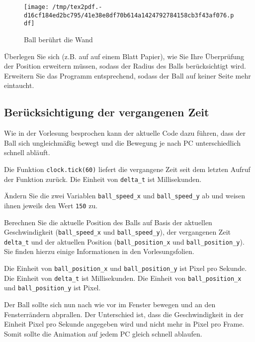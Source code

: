 \documentclass[
]{scrartcl}
\begin{document}
\begin{figure}
\centering
\texttt{[image: /tmp/tex2pdf.-d16cf184ed2bc795/41e38e8df70b614a1424792784158cb3f43af076.pdf]}
\caption{\label{fig:collision}Ball berührt die Wand}
\end{figure}

 Überlegen Sie sich (z.B. auf auf einem Blatt Papier), wie
Sie Ihre Überprüfung der Position erweitern müssen, sodass der Radius
des Balls berücksichtigt wird. Erweitern Sie das Programm entsprechend,
sodass der Ball auf keiner Seite mehr eintaucht.

\hypertarget{beruxfccksichtigung-der-vergangenen-zeit}{%
\subsection{Berücksichtigung der vergangenen
Zeit}\label{beruxfccksichtigung-der-vergangenen-zeit}}

Wie in der Vorlesung besprochen kann der aktuelle Code dazu führen, dass
der Ball sich ungleichmäßig bewegt und die Bewegung je nach PC
unterschiedlich schnell abläuft.

Die Funktion \texttt{clock.tick(60)} liefert die vergangene Zeit seit
dem letzten Aufruf der Funktion zurück. Die Einheit von
\texttt{delta\_t} ist Millisekunden.

 Ändern Sie die zwei Variablen \texttt{ball\_speed\_x} und
\texttt{ball\_speed\_y} ab und weisen ihnen jeweils den Wert
\texttt{150} zu.

 Berechnen Sie die aktuelle Position des Balls auf Basis
der aktuellen Geschwindigkeit (\texttt{ball\_speed\_x} und
\texttt{ball\_speed\_y}), der vergangenen Zeit \texttt{delta\_t} und der
aktuellen Position (\texttt{ball\_position\_x} und
\texttt{ball\_position\_y}). Sie finden hierzu einige Informationen in
den Vorlesungsfolien.

 Die Einheit von \texttt{ball\_position\_x}
und \texttt{ball\_position\_y} ist Pixel pro Sekunde. Die Einheit von
\texttt{delta\_t} ist Millisekunden. Die Einheit von
\texttt{ball\_position\_x} und \texttt{ball\_position\_y} ist Pixel.

Der Ball sollte sich nun nach wie vor im Fenster bewegen und an den
Fensterrändern abprallen. Der Unterschied ist, dass die Geschwindigkeit
in der Einheit Pixel pro Sekunde angegeben wird und nicht mehr in Pixel
pro Frame. Somit sollte die Animation auf jedem PC gleich schnell
ablaufen.

\newpage
\end{document}
